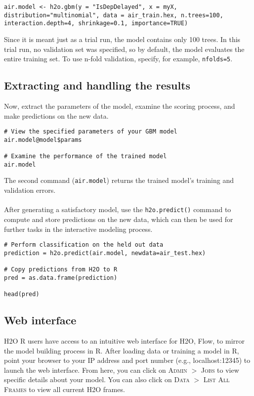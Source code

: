{\begin{lstlisting}[style=R]
air.model <- h2o.gbm(y = "IsDepDelayed", x = myX, distribution="multinomial", data = air_train.hex, n.trees=100, interaction.depth=4, shrinkage=0.1, importance=TRUE)
\end{lstlisting}

\noindent
Since it is meant just as a trial run, the model contains only 100 trees. In this trial run, no validation set was specified, so by default, the model evaluates the entire training set.  To use n-fold validation, specify, for example, \texttt{nfolds=5}. 

\subsection{Extracting and handling the results}  

Now, extract the parameters of the model, examine the scoring process, and make predictions on the new data.

\begin{lstlisting}[style=R]
# View the specified parameters of your GBM model
air.model@model$params

# Examine the performance of the trained model
air.model

\end{lstlisting}
\noindent
The second command ({\texttt{air.model}}) returns the trained model's training and validation errors. 
\\
\\
After generating a satisfactory model, use the \texttt{h2o.predict()} command to compute and store predictions on the new data, which can then be used for further tasks in the interactive modeling process.
\begin{lstlisting}[style=R]
# Perform classification on the held out data
prediction = h2o.predict(air.model, newdata=air_test.hex)

# Copy predictions from H2O to R
pred = as.data.frame(prediction)

head(pred)

\end{lstlisting}


\subsection{Web interface} 

H2O R users have access to an intuitive web interface for H2O, Flow, to mirror the model building process in R. After loading data or training a model in R, point your browser to your IP address and port number (e.g., localhost:12345) to launch the web interface. From here, you can click on \textsc{Admin} $>$ \textsc{Jobs} to view specific details about your model. You can also click on \textsc{Data} $>$ \textsc{List All Frames} to view all current H2O frames. 

}
